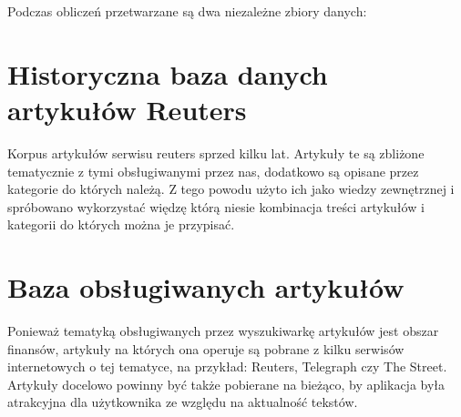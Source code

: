Podczas obliczeń przetwarzane są dwa niezależne zbiory danych:
\section{Historyczna baza danych artykułów Reuters}
Korpus artykułów serwisu reuters sprzed kilku lat. Artykuły te są zbliżone tematycznie z tymi obsługiwanymi przez nas, dodatkowo są opisane przez kategorie do których należą. Z tego powodu użyto ich jako wiedzy zewnętrznej i spróbowano wykorzystać więdzę którą niesie kombinacja treści artykułów i kategorii do których można je przypisać.

\section{Baza obsługiwanych artykułów}
Ponieważ tematyką obsługiwanych przez wyszukiwarkę artykułów jest obszar finansów, artykuły na których ona operuje są pobrane z kilku serwisów internetowych o tej tematyce, na przykład: Reuters, Telegraph czy The Street. Artykuły docelowo powinny być także pobierane na bieżąco, by aplikacja była atrakcyjna dla użytkownika ze względu na aktualność tekstów.